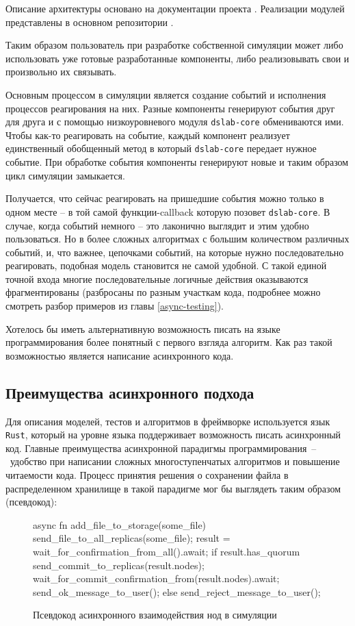Описание архитектуры основано на документации проекта \cite{dslab-architecture}.  Реализации модулей представлены в основном репозитории \cite{dslab-repo}.

Таким образом пользователь при разработке собственной симуляции может либо использовать уже готовые разработанные компоненты, либо реализовывать свои и произвольно их связывать. 

Основным процессом в симуляции является создание событий и исполнения процессов реагирования на них. Разные компоненты генерируют события друг для друга и с помощью низкоуровневого модуля \texttt{dslab-core} обмениваются ими. Чтобы как-то реагировать на событие, каждый компонент реализует единственный обобщенный метод в который \texttt{dslab-core} передает нужное событие. При обработке события компоненты генерируют новые и таким образом цикл симуляции замыкается. 

Получается, что сейчас реагировать на пришедшие события можно только в одном месте -- в той самой функции-callback которую позовет \texttt{dslab-core}. В случае, когда событий немного -- это лаконично выглядит и этим удобно пользоваться. Но в более сложных алгоритмах с большим количеством различных событий, и, что важнее, цепочками событий, на которые нужно последовательно реагировать, подобная модель становится не самой удобной. С такой единой точной входа многие последовательные логичные действия оказываются фрагментированы (разбросаны по разным участкам кода, подробнее можно смотреть разбор примеров из главы \ref{async-testing}). 

Хотелось бы иметь альтернативную возможность писать на языке программирования более понятный с первого взгляда алгоритм. Как раз такой возможностью является написание асинхронного кода.


\subsection{Преимущества асинхронного подхода}

Для описания моделей, тестов и алгоритмов в фреймворке используется язык \texttt{Rust}, который на уровне языка поддерживает возможность писать асинхронный код. Главные преимущества асинхронной парадигмы программирования~--~удобство при написании сложных многоступенчатых алгоритмов и повышение читаемости кода. Процесс принятия решения о сохранении файла в распределенном хранилище в такой парадигме мог бы выглядеть таким образом (псевдокод):

\begin{figure}[H]
    \small
\begin{rustcode}
    async fn add_file_to_storage(some_file) {
        send_file_to_all_replicas(some_file);
        result = wait_for_confirmation_from_all().await;
        if result.has_quorum {
            send_commit_to_replicas(result.nodes);
            wait_for_commit_confirmation_from(result.nodes).await;
            send_ok_message_to_user();
        } else {
            send_reject_message_to_user();
        }
    }
\end{rustcode}
\caption{Псевдокод асинхронного взаимодействия нод в симуляции}
\label{pseudocode}
\end{figure}

